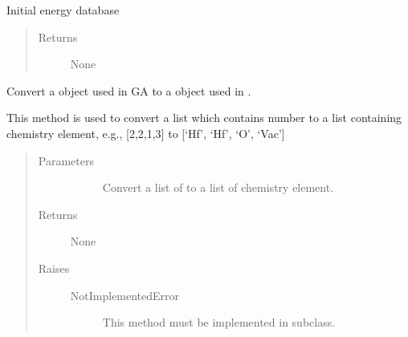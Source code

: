 \documentclass[letterpaper,10pt,english]{sphinxmanual}
\begin{document}
\begin{fulllineitems}
\begin{fulllineitems}
\label{\detokenize{pygace:pygace.gace.AbstractApp.get_energy_info_from_database}}
\sphinxAtStartPar
Initial energy database
\begin{quote}\begin{description}
\item[{Returns}] \leavevmode\begin{description}
\item[{None}] \leavevmode
\end{description}

\end{description}\end{quote}

\end{fulllineitems}


\begin{fulllineitems}
\label{\detokenize{pygace:pygace.gace.AbstractApp.ind_to_elis}}
\sphinxAtStartPar
Convert a object used in GA to a object used in .

\sphinxAtStartPar
This method is used to convert a list which contains number
to a list containing chemistry element, e.g., {[}2,2,1,3{]} to
{[}‘Hf’, ‘Hf’, ‘O’, ‘Vac’{]}
\begin{quote}\begin{description}
\item[{Parameters}] \leavevmode\begin{description}
\item[{}] \leavevmode
\sphinxAtStartPar
Convert a list of  to a list of chemistry element.

\end{description}

\item[{Returns}] \leavevmode\begin{description}
\item[{None}] \leavevmode
\end{description}

\item[{Raises}] \leavevmode\begin{description}
\item[{NotImplementedError}] \leavevmode
\sphinxAtStartPar
This method must be implemented in subclass.


\end{description}
\end{description}
\end{quote}
\end{fulllineitems}
\end{fulllineitems}
\end{document}
